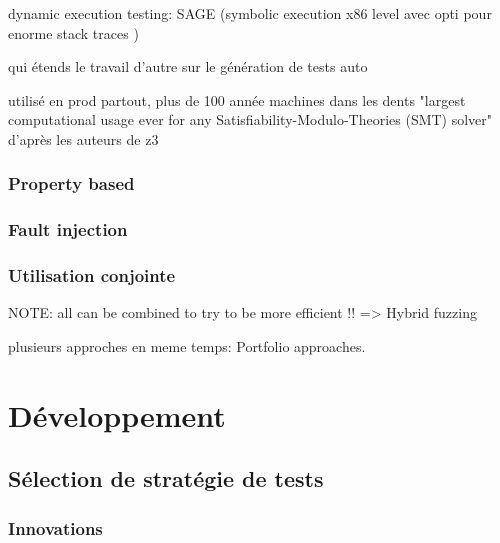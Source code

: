 \documentclass[a4paper]{report}
\begin{document}
dynamic execution testing: SAGE \cite{godefroid2008automated} (symbolic execution x86 level avec opti pour enorme stack traces \cite{Godefroid2020} ) 

qui étends le travail d'autre sur le génération de tests auto \cite{Godefroid2020} \cite{cadar2005execution} \cite{godefroid2005dart}

utilisé en prod partout, plus de 100 année machines dans les dents
"largest computational usage ever for any Satisfiability-Modulo-Theories (SMT) solver" d'après les auteurs de z3 \cite{moura2008z3}

\subsection{Property based}



\cite{Fink1997}

\cite{Paraskevopoulou2015}

\cite{Papadakis2011}


\subsection{Fault injection}




\subsection{Utilisation conjointe}

NOTE: all can be combined to try to be more efficient !! \cite{Godefroid2020} => Hybrid fuzzing

plusieurs approches en meme temps: Portfolio approaches.

\chapter{Développement}

\section{Sélection de stratégie de tests}


\subsection{Innovations}
\end{document}
